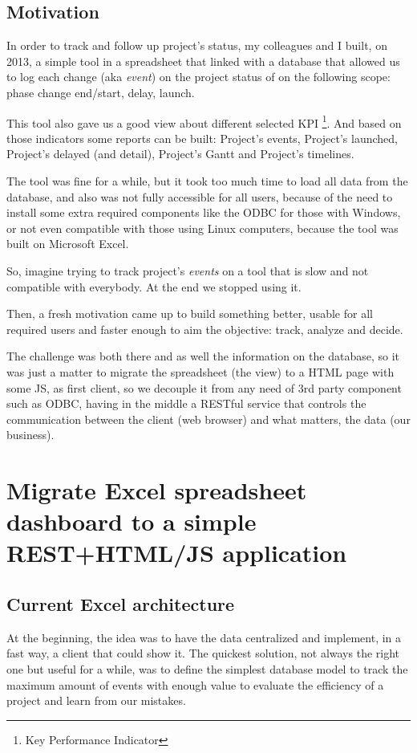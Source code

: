 \chapter*{Motivation}
In order to track and follow up project's status, my colleagues and I
built, on 2013, a simple tool in a spreadsheet that linked with a database that
allowed us to log each change (aka \emph{event}) on the project status of on
the following scope: phase change end/start, delay, launch.

This tool also gave us a good view about different selected KPI \footnote{Key
Performance Indicator}. And based on those indicators some reports can be
built:
Project's events, Project's launched, Project's delayed (and detail), Project's
Gantt and Project's timelines.

The tool was fine for a while, but it took too much time to load all data
from the database, and also was not fully accessible for all users, because
of the need to install some extra required components like the ODBC for those with
Windows, or not even compatible with those using Linux computers, because the
tool was built on Microsoft Excel.

So, imagine trying to track project's \emph{events} on a tool that is slow
and not compatible with everybody. At the end we stopped using it.

Then, a fresh motivation came up to build something better,
usable for all required users and faster enough to aim the objective: track,
analyze and decide. 

The challenge was both there and as well the information on the database, so it
was just a matter to migrate the spreadsheet (the view) to a HTML page with some JS,
as first client, so we decouple it from any need of 3rd party component such as
ODBC, having in the middle a RESTful service that
controls the communication between the client (web browser) and what matters,
the data (our business).

\part{Migrate Excel spreadsheet dashboard to a simple REST+HTML/JS
application}
\label{c_phaseone}

\chapter{Current Excel architecture}
At the beginning, the idea was to have the data centralized
\label{t_main_objective} and implement, in a fast way, a client that could show
it. The quickest solution, not always the right one but useful for a while, was
to define the simplest database model to  track the maximum amount of events
with enough value to evaluate the  efficiency of a project and learn from our
mistakes.


